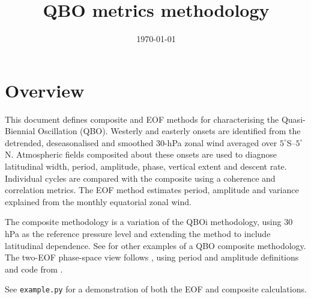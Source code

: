 \documentclass[11pt,a4paper]{article}
\title{QBO metrics methodology}
\author{}
\date{\today}
\begin{document}
\maketitle

\section{Overview}

This document defines composite and EOF methods for characterising the
Quasi-Biennial Oscillation (QBO).  Westerly and easterly onsets are identified
from the detrended, deseasonalised and smoothed 30-hPa zonal wind averaged over
$5^\circ$S--$5^\circ$N.  Atmospheric fields composited about these onsets are
used to diagnose latitudinal width, period, amplitude, phase, vertical extent
and descent rate.  Individual cycles are compared with the composite using a
coherence and correlation metrics.
The EOF method estimates period, amplitude and variance explained from the
monthly equatorial zonal wind.

The composite methodology is a variation of the QBOi methodology, using 30 hPa as the reference pressure level
and extending the method to include latitudinal dependence. See \citet{pahlavan2021, simpson2025, yu2017,
lee2024} for other examples of a QBO composite methodology. The two-EOF phase-space view follows
\citet{wallace1993}, using period and amplitude definitions and code from \citet{dallasanta2021}.

See \texttt{example.py} for a demonstration of both the EOF and composite calculations.
\end{document}
